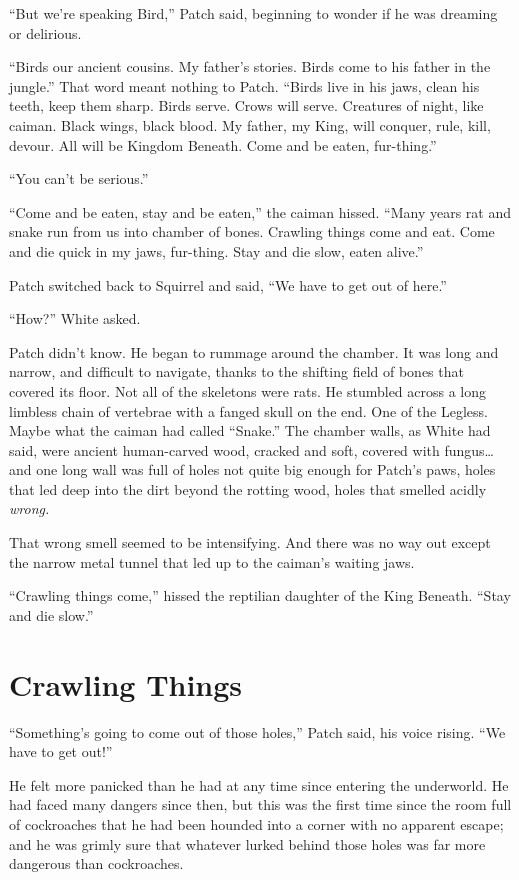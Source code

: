 \documentclass[ebook,oneside,openany,17pt]{memoir}
\renewcommand{\thechapter}{\Roman{chapter}}
\newcounter{sections}
\newcommand{\sections}[1]{%
  \section*{#1}
  \addtocounter{sections}{1}%
  \pdfbookmark[1]{#1}{section.\thechapter.\thesections}}
\begin{document}
“But we’re speaking Bird,” Patch said, beginning to wonder if he was
dreaming or delirious.

“Birds our ancient cousins. My father’s stories. Birds come to his
father in the jungle.” That word meant nothing to Patch. “Birds live
in his jaws, clean his teeth, keep them sharp. Birds serve. Crows will
serve. Creatures of night, like caiman. Black wings, black blood. My
father, my King, will conquer, rule, kill, devour. All will be Kingdom
Beneath. Come and be eaten, fur-thing.”

“You can’t be serious.”

“Come and be eaten, stay and be eaten,” the caiman hissed. “Many years
rat and snake run from us into chamber of bones. Crawling things come
and eat. Come and die quick in my jaws, fur-thing. Stay and die slow,
eaten alive.”

Patch switched back to Squirrel and said, “We have to get out of
here.”

“How?” White asked.

Patch didn’t know. He began to rummage around the chamber. It was long
and narrow, and difficult to navigate, thanks to the shifting field of
bones that covered its floor. Not all of the skeletons were rats. He
stumbled across a long limbless chain of vertebrae with a fanged skull
on the end. One of the Legless. Maybe what the caiman had called
“Snake.” The chamber walls, as White had said, were ancient
human-carved wood, cracked and soft, covered with fungus… and one long
wall was full of holes not quite big enough for Patch’s paws, holes
that led deep into the dirt beyond the rotting wood, holes that
smelled acidly \emph{wrong.}

That wrong smell seemed to be intensifying. And there was no way out
except the narrow metal tunnel that led up to the caiman’s waiting
jaws.

“Crawling things come,” hissed the reptilian daughter of the King
Beneath. “Stay and die slow.”


\sections{Crawling Things}

“Something’s going to come out of those holes,” Patch said, his voice
rising. “We have to get out!”

He felt more panicked than he had at any time since entering the
underworld. He had faced many dangers since then, but this was the
first time since the room full of cockroaches that he had been hounded
into a corner with no apparent escape; and he was grimly sure that
whatever lurked behind those holes was far more dangerous than
cockroaches.
\end{document}
